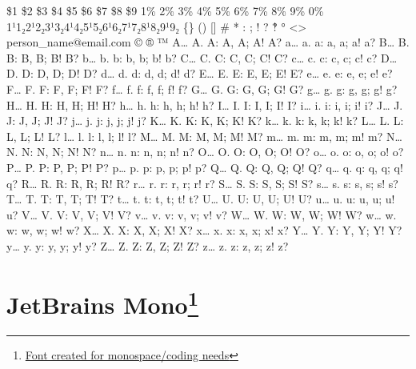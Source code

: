 \break \$1 \$2 \$3 \$4 \$5 \$6 \$7 \$8 \$9 1\% 2\% 3\% 4\% 5\% 6\% 7\% 8\% 9\% 0\%
\break 1¹1₂2¹2₂3¹3₂4¹4₂5¹5₂6¹6₂7¹7₂8¹8₂9¹9₂
\break \{\} () [] \# * : ; ! ? ‽ ° <> person\_name@email.com © ® ™
\break A… A. A: A, A; A! A? a… a. a: a, a; a! a?
\break B… B. B: B, B; B! B? b… b. b: b, b; b! b?
\break C… C. C: C, C; C! C? c… c. c: c, c; c! c?
\break D… D. D: D, D; D! D? d… d. d: d, d; d! d?
\break E… E. E: E, E; E! E? e… e. e: e, e; e! e?
\break F… F. F: F, F; F! F? f… f. f: f, f; f! f?
\break G… G. G: G, G; G! G? g… g. g: g, g; g! g?
\break H… H. H: H, H; H! H? h… h. h: h, h; h! h?
\break I… I. I: I, I; I! I? i… i. i: i, i; i! i?
\break J… J. J: J, J; J! J? j… j. j: j, j; j! j?
\break K… K. K: K, K; K! K? k… k. k: k, k; k! k?
\break L… L. L: L, L; L! L? l… l. l: l, l; l! l?
\break M… M. M: M, M; M! M? m… m. m: m, m; m! m?
\break N… N. N: N, N; N! N? n… n. n: n, n; n! n?
\break O… O. O: O, O; O! O? o… o. o: o, o; o! o?
\break P… P. P: P, P; P! P? p… p. p: p, p; p! p?
\break Q… Q. Q: Q, Q; Q! Q? q… q. q: q, q; q! q?
\break R… R. R: R, R; R! R? r… r. r: r, r; r! r?
\break S… S. S: S, S; S! S? s… s. s: s, s; s! s?
\break T… T. T: T, T; T! T? t… t. t: t, t; t! t?
\break U… U. U: U, U; U! U? u… u. u: u, u; u! u?
\break V… V. V: V, V; V! V? v… v. v: v, v; v! v?
\break W… W. W: W, W; W! W? w… w. w: w, w; w! w?
\break X… X. X: X, X; X! X? x… x. x: x, x; x! x?
\break Y… Y. Y: Y, Y; Y! Y? y… y. y: y, y; y! y?
\break Z… Z. Z: Z, Z; Z! Z? z… z. z: z, z; z! z?
\pagebreak
\normalfont
\hypertarget{trouble10}{}\section[JetBrains Mono]{JetBrains Mono\footnote{\href{https://www.jetbrains.com/lp/mono/}{Font created for monospace/coding needs}}}\label{trouble10}

